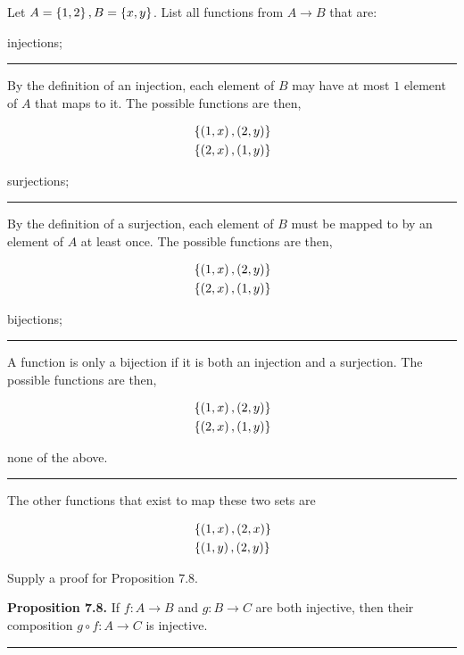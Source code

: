 \documentclass{article}
\begin{document}
\problem{}
Let $A = \left \{ 1, 2 \right \}, B = \left \{ x, y \right \}$. List all functions from $A \to B$ that are:

\subproblema{}
injections;
\hrule

By the definition of an injection, each element of $B$ may have at most $1$ element of $A$ that maps to it.
The possible functions are then,

\begin{align*}
  & \left \{ \left (1, x \right), \left (2, y \right) \right \} \\
  & \left \{ \left (2, x \right), \left (1, y \right) \right \} \\
\end{align*}

\subproblema{}
surjections;
\hrule

By the definition of a surjection, each element of $B$ must be mapped to by an element of $A$ at least once.
The possible functions are then,

\begin{align*}
  & \left \{ \left (1, x \right), \left (2, y \right) \right \} \\
  & \left \{ \left (2, x \right), \left (1, y \right) \right \} \\
\end{align*}


\subproblema{}
bijections;
\hrule

A function is only a bijection if it is both an injection and a surjection.
The possible functions are then,

\begin{align*}
  & \left \{ \left (1, x \right), \left (2, y \right) \right \} \\
  & \left \{ \left (2, x \right), \left (1, y \right) \right \} \\
\end{align*}

\subproblema{}
none of the above.
\hrule

The other functions that exist to map these two sets are

\begin{align*}
  & \left \{ \left (1, x \right), \left (2, x \right) \right \} \\
  & \left \{ \left (1, y \right), \left (2, y \right) \right \} \\
\end{align*}

\problem{}
\subproblema{}
Supply a proof for Proposition 7.8.

\textbf{Proposition 7.8.}
If $f : A \to B$ and $g : B \to C$ are both injective, then their composition $g \circ f : A \to C$ is injective.

\hrule
\end{document}
